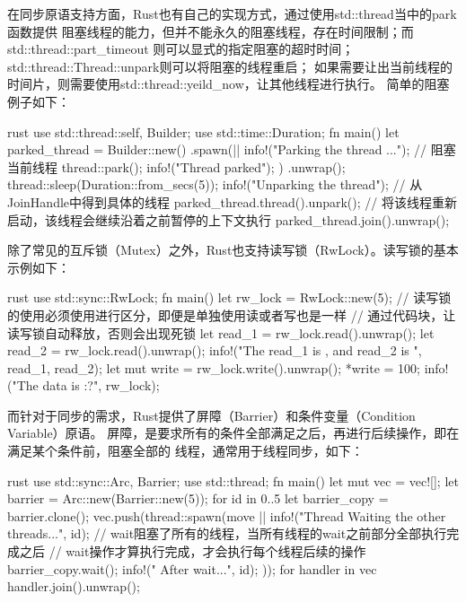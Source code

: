 在同步原语支持方面，Rust也有自己的实现方式，通过使用std::thread当中的park函数提供
阻塞线程的能力，但并不能永久的阻塞线程，存在时间限制；而std::thread::part\_timeout
则可以显式的指定阻塞的超时时间；std::thread::Thread::unpark则可以将阻塞的线程重启；
如果需要让出当前线程的时间片，则需要使用std::thread::yeild\_now，让其他线程进行执行。
简单的阻塞例子如下：
\begin{code-block}{rust}
use std::thread::{self, Builder};
use std::time::Duration;
fn main() {
    let parked_thread = Builder::new()
        .spawn(|| {
            info!("Parking the thread ...");
            // 阻塞当前线程
            thread::park();
            info!("Thread parked");
        })
        .unwrap();
    thread::sleep(Duration::from_secs(5));
    info!("Unparking the thread");
    // 从JoinHandle中得到具体的线程
    parked_thread.thread().unpark();
    // 将该线程重新启动，该线程会继续沿着之前暂停的上下文执行
    parked_thread.join().unwrap();
}
\end{code-block}

除了常见的互斥锁（Mutex）之外，Rust也支持读写锁（RwLock）。读写锁的基本示例如下：
\begin{code-block}{rust}
use std::sync::RwLock;
fn main() {
    let rw_lock = RwLock::new(5);
    // 读写锁的使用必须使用{}进行区分，即便是单独使用读或者写也是一样
    // 通过代码块{}，让读写锁自动释放，否则会出现死锁
    {
        let read_1 = rw_lock.read().unwrap();
        let read_2 = rw_lock.read().unwrap();
        info!("The read_1 is {}, and read_2 is {}", read_1, read_2);
    }
    {
        let mut write = rw_lock.write().unwrap();
        *write = 100;
    }
    info!("The data is {:?}", rw_lock);
}
\end{code-block}

而针对于同步的需求，Rust提供了屏障（Barrier）和条件变量（Condition Variable）原语。
屏障，是要求所有的条件全部满足之后，再进行后续操作，即在满足某个条件前，阻塞全部的
线程，通常用于线程同步，如下：
\begin{code-block}{rust}
use std::sync::{Arc, Barrier};
use std::thread;
fn main() {
    let mut vec = vec![];
    let barrier = Arc::new(Barrier::new(5));
    for id in 0..5 {
        let barrier_copy = barrier.clone();
        vec.push(thread::spawn(move || {
            info!("Thread {} Waiting the other threads...", id);
            // wait阻塞了所有的线程，当所有线程的wait之前部分全部执行完成之后
            // wait操作才算执行完成，才会执行每个线程后续的操作
            barrier_copy.wait();
            info!("{} After wait...", id);
        }));
    }
    for handler in vec {
        handler.join().unwrap();
    }
}
\end{code-block}

